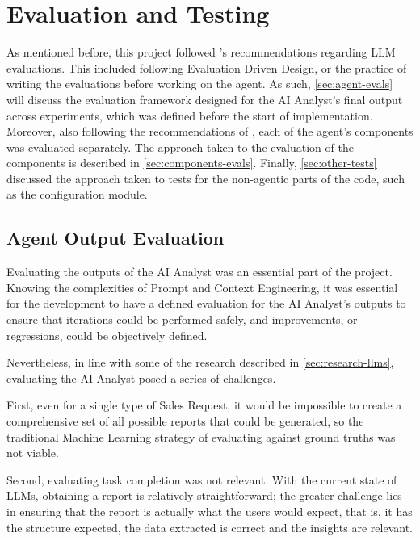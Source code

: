 \documentclass[a4paper]{report}
\begin{document}
\chapter{Evaluation and Testing}
\label{chapter:evaluation-testing}

As mentioned before, this project followed \cite{aiebook2025}'s recommendations regarding LLM evaluations. This included following Evaluation Driven Design, or the practice of writing the evaluations before working on the agent. As such, \autoref{sec:agent-evals} will discuss the evaluation framework designed for the AI Analyst's final output across experiments, which was defined before the start of implementation. Moreover, also following the recommendations of \cite{aiebook2025}, each of the agent's components was evaluated separately. The approach taken to the evaluation of the components is described in \autoref{sec:components-evals}. Finally, \autoref{sec:other-tests} discussed the approach taken to tests for the non-agentic parts of the code, such as the configuration module.

\section{Agent Output Evaluation}
\label{sec:agent-evals}

Evaluating the outputs of the AI Analyst was an essential part of the project. Knowing the complexities of Prompt and Context Engineering, it was essential for the development to have a defined evaluation for the AI Analyst's outputs to ensure that iterations could be performed safely, and improvements, or regressions, could be objectively defined.

Nevertheless, in line with some of the research described in \autoref{sec:research-llms}, evaluating the AI Analyst posed a series of challenges.

First, even for a single type of Sales Request, it would be impossible to create a comprehensive set of all possible reports that could be generated, so the traditional Machine Learning strategy of evaluating against ground truths was not viable.

Second, evaluating task completion was not relevant. With the current state of LLMs, obtaining a report is relatively straightforward; the greater challenge lies in ensuring that the report is actually what the users would expect, that is, it has the structure expected, the data extracted is correct and the insights are relevant.
\end{document}
